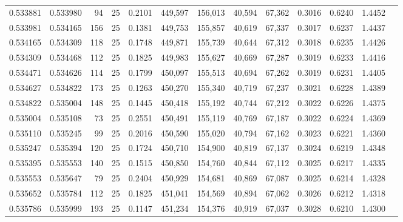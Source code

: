 \begin{tabular}{rrrrrrrrrrrrr}
0.533881 & 0.533980 &    94 &  25 &                                     0.2101 & 449,597 & 156,013 &  40,594 &  67,362 & 0.3016 & 0.6240 & 1.4452 \\
0.533981 & 0.534165 &   156 &  25 &                                     0.1381 & 449,753 & 155,857 &  40,619 &  67,337 & 0.3017 & 0.6237 & 1.4437 \\
0.534165 & 0.534309 &   118 &  25 &                                     0.1748 & 449,871 & 155,739 &  40,644 &  67,312 & 0.3018 & 0.6235 & 1.4426 \\
0.534309 & 0.534468 &   112 &  25 &                                     0.1825 & 449,983 & 155,627 &  40,669 &  67,287 & 0.3019 & 0.6233 & 1.4416 \\
0.534471 & 0.534626 &   114 &  25 &                                     0.1799 & 450,097 & 155,513 &  40,694 &  67,262 & 0.3019 & 0.6231 & 1.4405 \\
0.534627 & 0.534822 &   173 &  25 &                                     0.1263 & 450,270 & 155,340 &  40,719 &  67,237 & 0.3021 & 0.6228 & 1.4389 \\
0.534822 & 0.535004 &   148 &  25 &                                     0.1445 & 450,418 & 155,192 &  40,744 &  67,212 & 0.3022 & 0.6226 & 1.4375 \\
0.535004 & 0.535108 &    73 &  25 &                                     0.2551 & 450,491 & 155,119 &  40,769 &  67,187 & 0.3022 & 0.6224 & 1.4369 \\
0.535110 & 0.535245 &    99 &  25 &                                     0.2016 & 450,590 & 155,020 &  40,794 &  67,162 & 0.3023 & 0.6221 & 1.4360 \\
0.535247 & 0.535394 &   120 &  25 &                                     0.1724 & 450,710 & 154,900 &  40,819 &  67,137 & 0.3024 & 0.6219 & 1.4348 \\
0.535395 & 0.535553 &   140 &  25 &                                     0.1515 & 450,850 & 154,760 &  40,844 &  67,112 & 0.3025 & 0.6217 & 1.4335 \\
0.535553 & 0.535647 &    79 &  25 &                                     0.2404 & 450,929 & 154,681 &  40,869 &  67,087 & 0.3025 & 0.6214 & 1.4328 \\
0.535652 & 0.535784 &   112 &  25 &                                     0.1825 & 451,041 & 154,569 &  40,894 &  67,062 & 0.3026 & 0.6212 & 1.4318 \\
0.535786 & 0.535999 &   193 &  25 &                                     0.1147 & 451,234 & 154,376 &  40,919 &  67,037 & 0.3028 & 0.6210 & 1.4300 \\

\end{tabular}
